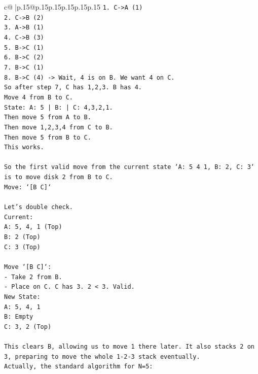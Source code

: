 \documentclass{article}
\begin{document}
{\begin{supertabular}{c@{$\;$}|p{.15\linewidth}@{}p{.15\linewidth}p{.15\linewidth}p{.15\linewidth}p{.15\linewidth}p{.15\linewidth}}
{{{\texttt{1. C{-}>A (1)} \\
\texttt{2. C{-}>B (2)} \\
\texttt{3. A{-}>B (1)} \\
\texttt{4. C{-}>B (3)} \\
\texttt{5. B{-}>C (1)} \\
\texttt{6. B{-}>C (2)} \\
\texttt{7. B{-}>C (1)} \\
\texttt{8. B{-}>C (4) {-}> Wait, 4 is on B. We want 4 on C.} \\
\texttt{So after step 7, C has 1,2,3. B has 4.} \\
\texttt{Move 4 from B to C.} \\
\texttt{State: A: 5 | B: | C: 4,3,2,1.} \\
\texttt{Then move 5 from A to B.} \\
\texttt{Then move 1,2,3,4 from C to B.} \\
\texttt{Then move 5 from B to C.} \\
\texttt{This works.} \\
\\ 
\texttt{So the first valid move from the current state `A: 5 4 1, B: 2, C: 3` is to move disk 2 from B to C.} \\
\texttt{Move: `{[}B C{]}`} \\
\\ 
\texttt{Let's double check.} \\
\texttt{Current:} \\
\texttt{A: 5, 4, 1 (Top)} \\
\texttt{B: 2 (Top)} \\
\texttt{C: 3 (Top)} \\
\\ 
\texttt{Move `{[}B C{]}`:} \\
\texttt{{-} Take 2 from B.} \\
\texttt{{-} Place on C. C has 3. 2 < 3. Valid.} \\
\texttt{New State:} \\
\texttt{A: 5, 4, 1} \\
\texttt{B: Empty} \\
\texttt{C: 3, 2 (Top)} \\
\\ 
\texttt{This clears B, allowing us to move 1 there later. It also stacks 2 on 3, preparing to move the whole 1{-}2{-}3 stack eventually.} \\
\texttt{Actually, the standard algorithm for N=5:} \\
}}}
\end{supertabular}}
\end{document}
